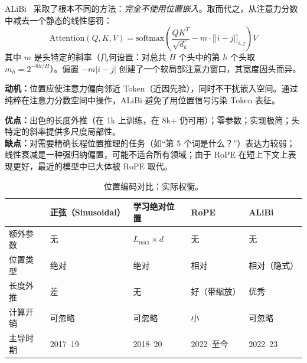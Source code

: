 ALiBi~\cite{press2022train} 采取了根本不同的方法：\emph{完全不使用位置嵌入}。取而代之，从注意力分数中减去一个静态的线性惩罚：
\[
\text{Attention}(Q, K, V) = \text{softmax}\!\left(\frac{QK^T}{\sqrt{d_k}} - m \cdot \bigl[|i-j|\bigr]_{i,j}\right) V
\]
其中 $m$ 是头特定的斜率（几何设置：对总共 $H$ 个头中的第 $h$ 个头取 $m_h = 2^{-8h/H}$）。偏置 $-m|i-j|$ 创建了一个软局部注意力窗口，其宽度因头而异。

\textbf{动机：}位置应使注意力偏向邻近 Token（近因先验），同时不干扰嵌入空间。通过纯粹在注意力分数空间中操作，ALiBi 避免了用位置信号污染 Token 表征。

\textbf{优点：}出色的长度外推（在 1k 上训练，在 8k+ 仍可用）；零参数；实现极简；头特定的斜率提供多尺度局部性。\\

\textbf{缺点：}对需要精确长程位置推理的任务（如``第 5 个词是什么？''）表达力较弱；线性衰减是一种强归纳偏置，可能不适合所有领域；由于 RoPE 在短上下文上表现更好，最近的模型中已大体被 RoPE 取代。

\begin{table}[ht!]
\centering\small
\caption{位置编码对比：实际权衡。}
\begin{tabularx}{0.82\linewidth}{@{}l Z{1.58} Z{0.87} Z{0.77} Z{0.78}@{}}
\toprule
 & \textbf{正弦（Sinusoidal）} & \textbf{学习绝对位置} & \textbf{RoPE} & \textbf{ALiBi} \\
\midrule
额外参数 & 无 & $L_{\max} \times d$ & 无 & 无 \\
位置类型 & 绝对 & 绝对 & 相对 & 相对（隐式） \\
长度外推 & 差 & 无 & 好（带缩放） & 优秀 \\
计算开销 & 可忽略 & 可忽略 & 小 & 可忽略 \\
主导时期 & 2017--19 & 2018--20 & 2022--至今 & 2022--23 \\
\bottomrule
\end{tabularx}
\end{table}

